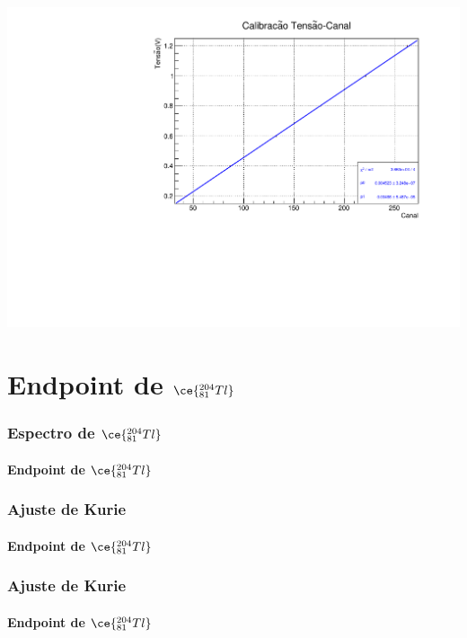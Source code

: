 \documentclass[10pt]{beamer}
\begin{document}
\begin{frame}
{\begin{tabular}{l|llll}
                                 \hline  
                                 \hline
        \end{tabular}}
     \includegraphics[scale=0.25]{calib2.pdf}

\end{frame}

\section{Endpoint de $\ce{^{204}_{81}Tl}$}
\begin{frame}\frametitle{Espectro de $\ce{^{204}_{81}Tl}$}\framesubtitle{Endpoint de $\ce{^{204}_{81}Tl}$}

  \begin{block}

  \end{block}

\end{frame}

\begin{frame}\frametitle{Ajuste de Kurie}\framesubtitle{Endpoint de $\ce{^{204}_{81}Tl}$}

  \begin{block}

  \end{block}

\end{frame}

\begin{frame}\frametitle{Ajuste de Kurie}\framesubtitle{Endpoint de $\ce{^{204}_{81}Tl}$}

  \begin{block}

  \end{block}

\end{frame}
\end{document}
